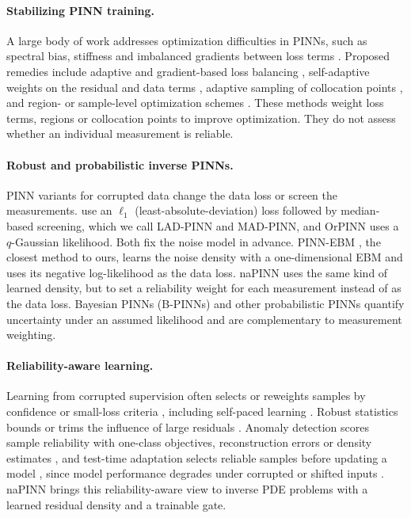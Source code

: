 \documentclass[twoside]{article}
\begin{document}
\paragraph{Stabilizing PINN training.}
A large body of work addresses optimization difficulties in PINNs, such as
spectral bias, stiffness and imbalanced gradients between loss terms
\citep{Rahaman2019, Wang2021, SWang2022, CWang2022}. Proposed remedies include
adaptive and gradient-based loss balancing
\citep{Chen2018, Xiang2022, Hwang2024, Bischof2025}, self-adaptive weights on
the residual and data terms \citep{McClenny2023}, adaptive sampling of
collocation points \citep{Nabian2021}, and region- or sample-level optimization
schemes \citep{Wu2024, Duan2025}. These methods weight loss terms, regions or
collocation points to improve optimization. They do not assess whether an
individual measurement is reliable.

\paragraph{Robust and probabilistic inverse PINNs.}
PINN variants for corrupted data change the data loss or screen the
measurements. \citet{Peng2022} use an $\ell_1$
(least-absolute-deviation) loss followed by median-based screening, which we
call LAD-PINN and MAD-PINN, and OrPINN \citep{Duarte2025} uses a $q$-Gaussian
likelihood. Both fix the noise model in advance. PINN-EBM \citep{Pilar2024}, the
closest method to ours, learns the noise density with a one-dimensional EBM
\citep{LeCun2006} and uses its negative log-likelihood as the data loss.
naPINN uses the same kind of learned density, but to set a reliability weight
for each measurement instead of as the data loss. Bayesian PINNs (B-PINNs) \citep{Yang2021} and other probabilistic PINNs
\citep{Yang2019} quantify uncertainty under an assumed likelihood and are
complementary to measurement weighting.

\paragraph{Reliability-aware learning.}
Learning from corrupted supervision often selects or reweights samples by
confidence or small-loss criteria \citep{Natarajan2013, Jiang2018, Han2018, Li2020},
including self-paced learning \citep{Kumar2010}. Robust statistics bounds or trims the influence of large residuals
\citep{Huber1973, Hampel1974, Rousseeuw1984}. Anomaly detection scores sample
reliability with one-class objectives, reconstruction errors or density
estimates \citep{Chandola2013, Ruff2018, Pang2021}, and test-time adaptation
selects reliable samples before updating a model \citep{Yang2024, Wang2024DSS},
since model performance degrades under corrupted or shifted inputs
\citep{Hendrycks2019, Ovadia2019}. naPINN brings this reliability-aware view to
inverse PDE problems with a learned residual density and a trainable gate.
\end{document}

